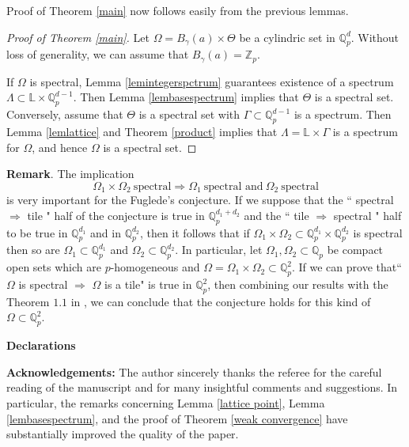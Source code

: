 \documentclass[a4paper,12pt]{amsart}
\def\Z{\mathbb{Z}}
\def\Q{\mathbb{Q}}
\begin{document}
Proof of Theorem \ref{main} now follows easily from the previous lemmas.


\begin{proof}[Proof of Theorem \ref{main}]

Let $\Omega=B_{\gamma}(a)\times\Theta$ be a cylindric set in $\Q_p^d$.
Without loss of generality, we can assume that $B_{\gamma}(a)=\Z_p$.

If $\Omega$ is  spectral, Lemma \ref{lemintegerspctrum} guarantees existence of a spectrum  $\Lambda\subset\mathbb{L}\times\Q_p^{d-1}$.
Then Lemma \ref{lembasespectrum} implies that $\Theta$ is a spectral set. Conversely, assume that $\Theta$ is a spectral set with
$\Gamma\subset\Q_p^{d-1}$ is a spectrum. Then Lemma \ref{lemlattice} and Theorem \ref{product} implies that $\Lambda=\mathbb{L}\times\Gamma$
is a spectrum for $\Omega$, and hence $\Omega$ is a spectral set.
\end{proof}

\textbf{Remark}.
The implication
 $$\Omega_1\times\Omega_2\ \mbox{spectral} \Rightarrow \Omega_1 \ \text{spectral and}\ \Omega_2 \ \text{spectral}$$
is very important for the Fuglede's conjecture. If we suppose that the `` spectral $\Rightarrow$
tile " half of the  conjecture is true in $\Q_p^{d_1+d_2}$ and the `` tile $\Rightarrow$ spectral "
half to be true in $\Q_p^{d_1}$ and in $\Q_p^{d_2}$, then it follows that if
$\Omega_1\times\Omega_2\subset\Q_p^{d_1}\times\Q_p^{d_2}$  is spectral
then so are $\Omega_1\subset\Q_p^{d_1}$ and $\Omega_2\subset\Q_p^{d_2}$.
In particular, let $\Omega_1,\Omega_2\subset\Q_p$ be compact open sets which are $p$-homogeneous and $\Omega=\Omega_1\times\Omega_2\subset\Q_p^2$.
If we can prove that``$\Omega$ is spectral $\Rightarrow$ $\Omega$ is a tile" is true in $\Q_p^2$, then
combining our results with the Theorem $1.1$ in \cite{Fan-Fan-Shi}, we can conclude that the conjecture holds
for this kind of $\Omega\subset\Q_p^2$.



\textbf{Declarations}

\textbf{ Acknowledgements:} %
The author sincerely thanks the referee for the careful reading of the manuscript
and for many insightful comments and suggestions. In particular, the remarks concerning
Lemma \ref{lattice point}, Lemma \ref{lembasespectrum}, and the proof of Theorem \ref{weak convergence}
have substantially improved the quality of the paper.
\end{document}

